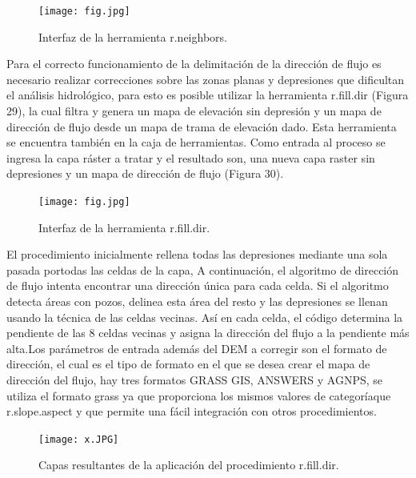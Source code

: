 \documentclass[12pt,hidelinks]{article}
\begin{document}
\begin{figure}[H]
    \centering
    \texttt{[image: fig.jpg]}
    \caption{Interfaz de la herramienta r.neighbors.}
    \label{fig:my_label}
\end{figure}
Para el correcto funcionamiento de la delimitación de la dirección de flujo es necesario realizar correcciones sobre las zonas planas y depresiones que dificultan el análisis hidrológico, para esto es posible utilizar la herramienta r.fill.dir (Figura 29), la cual filtra y genera un mapa de elevación sin depresión y un mapa de dirección de flujo desde un mapa de trama de elevación dado. Esta herramienta se encuentra también en la caja de herramientas. Como entrada al proceso se ingresa la capa ráster a tratar y el resultado son, una nueva capa raster sin depresiones y un mapa de dirección de flujo (Figura 30).

\begin{figure}[H]
    \centering
    \texttt{[image: fig.jpg]}
    \caption{Interfaz de la herramienta r.fill.dir.}
    \label{fig:my_label}
\end{figure}
El procedimiento inicialmente rellena todas las depresiones mediante una sola pasada portodas las celdas de la capa, A continuación, el algoritmo de dirección de flujo intenta encontrar una dirección única para cada celda. Si el algoritmo detecta áreas con pozos, delinea esta área del resto y las depresiones se llenan usando la técnica de las celdas vecinas. Así en cada celda, el código determina la pendiente de las 8 celdas vecinas y asigna la dirección del flujo a la pendiente más alta.Los parámetros de entrada además del DEM a corregir son el formato de dirección, el cual es el tipo de formato en el que se desea crear el mapa de dirección del flujo, hay tres formatos GRASS GIS, ANSWERS y AGNPS, se utiliza el formato grass ya que proporciona los mismos valores de categoríaque r.slope.aspect y que permite una fácil integración con otros procedimientos.
\begin{figure}[H]
    \centering
    \texttt{[image: x.JPG]}
    \caption{Capas resultantes de la aplicación del procedimiento r.fill.dir.}
    \label{fig:my_label}
\end{figure}
\end{document}

